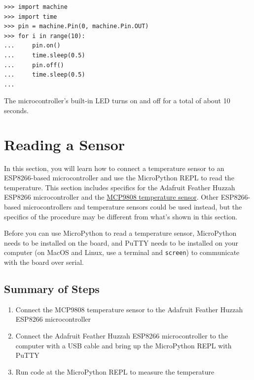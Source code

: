 \documentclass{book}
\providecommand{\tightlist}{%
      \setlength{\itemsep}{0pt}\setlength{\parskip}{0pt}}
\begin{document}
\begin{lstlisting}
>>> import machine
>>> import time
>>> pin = machine.Pin(0, machine.Pin.OUT)
>>> for i in range(10):
...     pin.on()
...     time.sleep(0.5)
...     pin.off()
...     time.sleep(0.5)
...
\end{lstlisting}

The microcontroller's built-in LED turns on and off for a total of about
10 seconds.
    




    
        \section{Reading a Sensor}\label{reading-a-sensor}
    




    
        In this section, you will learn how to connect a temperature sensor to
an ESP8266-based microcontroller and use the MicroPython REPL to read
the temperature. This section includes specifics for the Adafruit
Feather Huzzah ESP8266 microcontroller and the
\href{https://www.adafruit.com/product/1782}{MCP9808 temperature
sensor}. Other ESP8266-based microcontrollers and temperature sensors
could be used instead, but the specifics of the procedure may be
different from what's shown in this section.

Before you can use MicroPython to read a temperature sensor, MicroPython
needs to be installed on the board, and PuTTY needs to be installed on
your computer (on MacOS and Linux, use a terminal and
\lstinline!screen!) to communicate with the board over serial.
    




    
        \subsection{Summary of Steps}\label{summary-of-steps}
    




    
        \begin{enumerate}
\def\labelenumi{\arabic{enumi}.}
\tightlist
\item
  Connect the MCP9808 temperature sensor to the Adafruit Feather Huzzah
  ESP8266 microcontroller
\item
  Connect the Adafruit Feather Huzzah ESP8266 microcontroller to the
  computer with a USB cable and bring up the MicroPython REPL with PuTTY
\item
  Run code at the MicroPython REPL to measure the temperature
\end{enumerate}
    
\end{document}
